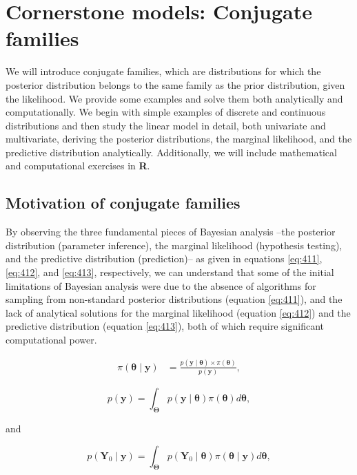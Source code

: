 \chapter{Cornerstone models: Conjugate families}\label{chap4}

We will introduce conjugate families, which are distributions for which the posterior distribution belongs to the same family as the prior distribution, given the likelihood. We provide some examples and solve them both analytically and computationally. We begin with simple examples of discrete and continuous distributions and then study the linear model in detail, both univariate and multivariate, deriving the posterior distributions, the marginal likelihood, and the predictive distribution analytically. Additionally, we will include mathematical and computational exercises in \textbf{R}.

\section{Motivation of conjugate families}\label{sec41}
By observing the three fundamental pieces of Bayesian analysis --the posterior distribution (parameter inference), the marginal likelihood (hypothesis testing), and the predictive distribution (prediction)-- as given in equations \ref{eq:411}, \ref{eq:412}, and \ref{eq:413}, respectively, we can understand that some of the initial limitations of Bayesian analysis were due to the absence of algorithms for sampling from non-standard posterior distributions (equation \ref{eq:411}), and the lack of analytical solutions for the marginal likelihood (equation \ref{eq:412}) and the predictive distribution (equation \ref{eq:413}), both of which require significant computational power.


\begin{align}
	\pi(\bm{\theta}\mid \bm{y})&=\frac{p(\bm{y}\mid \bm{\theta}) \times \pi(\bm{\theta})}{p(\bm{y})},
	\label{eq:411}
\end{align}

\begin{equation}
	p(\bm{y})=\int_{\bm{\Theta}}p(\bm{y}\mid \bm{\theta})\pi(\bm{\theta})d\bm{\theta},
	\label{eq:412}
\end{equation}

and 

\begin{equation}
	p(\bm{Y}_0\mid \bm{y})=\int_{\bm{\Theta}}p(\bm{Y}_0\mid \bm{\theta})\pi(\bm{\theta}\mid \bm{y})d\bm{\theta},
	\label{eq:413}
\end{equation}

